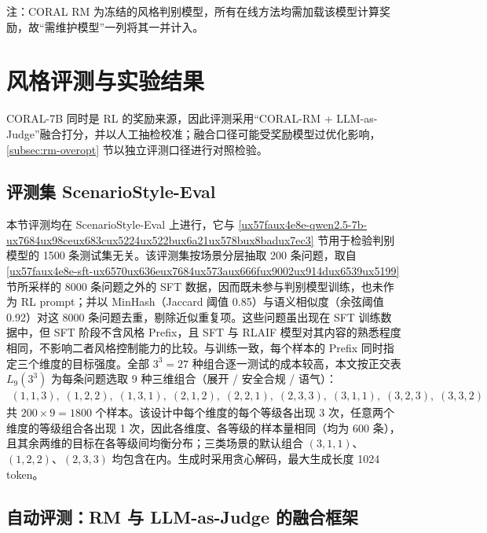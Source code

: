 \documentclass[fontset=fandol,type=master,campus=shenzhen,etitleauto=true]{hithesisbook}
\begin{document}
注：CORAL RM 为冻结的风格判别模型，所有在线方法均需加载该模型计算奖励，故“需维护模型”一列将其一并计入。

\section{风格评测与实验结果}\label{ux98ceux683cux8bc4ux6d4bux4f53ux7cfb}

CORAL-7B 同时是 RL 的奖励来源，因此评测采用“CORAL-RM + LLM-as-Judge”融合打分，并以人工抽检校准；融合口径可能受奖励模型过优化影响，\ref{subsec:rm-overopt} 节以独立评测口径进行对照检验。

\subsection{评测集 ScenarioStyle-Eval}\label{subsec:scenariostyle-eval}

本节评测均在 ScenarioStyle-Eval 上进行，它与 \ref{ux57faux4e8e-qwen2.5-7b-ux7684ux98ceux683cux5224ux522bux6a21ux578bux8badux7ec3} 节用于检验判别模型的 1500 条测试集无关。该评测集按场景分层抽取 200 条问题，取自 \ref{ux57faux4e8e-sft-ux6570ux636eux7684ux573aux666fux9002ux914dux6539ux5199} 节所采样的 8000 条问题之外的 SFT 数据，因而既未参与判别模型训练，也未作为 RL prompt；并以 MinHash（Jaccard 阈值 0.85）与语义相似度（余弦阈值 0.92）对这 8000 条问题去重，剔除近似重复项。这些问题虽出现在 SFT 训练数据中，但 SFT 阶段不含风格 Prefix，且 SFT 与 RLAIF 模型对其内容的熟悉程度相同，不影响二者风格控制能力的比较。与训练一致，每个样本的 Prefix 同时指定三个维度的目标强度。全部 $3^3 = 27$ 种组合逐一测试的成本较高，本文按正交表 $L_9(3^3)$ 为每条问题选取 9 种三维组合（展开 / 安全合规 / 语气）：
\begin{equation*}
\begin{gathered}
(1,1,3),\; (1,2,2),\; (1,3,1),\; (2,1,2),\; (2,2,1),\; (2,3,3),\; (3,1,1),\; (3,2,3),\; (3,3,2)
\end{gathered}
\end{equation*}
共 $200 \times 9 = 1800$ 个样本。该设计中每个维度的每个等级各出现 3 次，任意两个维度的等级组合各出现 1 次，因此各维度、各等级的样本量相同（均为 600 条），且其余两维的目标在各等级间均衡分布；三类场景的默认组合 $(3,1,1)$、$(1,2,2)$、$(2,3,3)$ 均包含在内。生成时采用贪心解码，最大生成长度 1024 token。

\subsection{自动评测：RM 与 LLM-as-Judge 的融合框架}\label{ux81eaux52a8ux8bc4ux6d4b}
\end{document}
